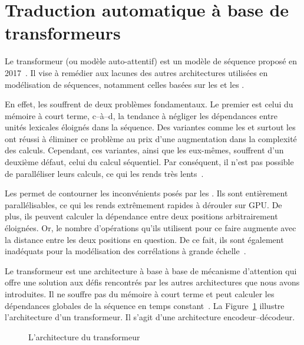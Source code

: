 \section{Traduction automatique à base de transformeurs}
\label{sec:nmt-attention}

Le transformeur (ou modèle auto-attentif) est un modèle de séquence proposé en 2017~\cite{attention}.
Il vise à remédier aux lacunes des autres architectures utilisées en modélisation de séquences, 
notamment celles basées sur les  et les .

En effet, les  souffrent de deux problèmes fondamentaux. 
Le premier est celui du mémoire à court terme, 
c--à--d, la tendance à négliger les dépendances entre unités lexicales éloignés dans la séquence.
Des variantes comme les  et surtout les  
ont réussi à éliminer ce problème au prix d'une augmentation dans la complexité des calculs.
Cependant, ces variantes, ainsi que les  eux-mêmes, souffrent d'un deuxième défaut,
celui du calcul séquentiel.
Par conséquent, il n'est pas possible de paralléliser leurs calculs, 
ce qui les rends très lents~\cite{attention,deep-nmt-survey}.

Les  permet de contourner les inconvénients posés par les .
Ils sont entièrement parallélisables, ce qui les rends extrêmement rapides à dérouler sur GPU.
De plus, ils peuvent calculer la dépendance entre deux positions arbitrairement éloignées.
Or, le nombre d'opérations qu'ils utilisent pour ce faire 
augmente avec la distance entre les deux positions en question.
De ce fait, ils sont également inadéquats pour la modélisation des corrélations à grande échelle~\cite{deep-nmt-survey}.

Le transformeur est une architecture à base à base de mécanisme d'attention 
qui offre une solution aux défis rencontrés par les autres architectures que nous avons introduites.
Il ne souffre pas du mémoire à court terme 
et peut calculer les dépendances globales de la séquence en temps constant~\cite{attention}.
La Figure~\ref{fig:transformer} illustre l'architecture d'un transformeur.
Il s'agit d'une architecture encodeur--décodeur.

\begin{figure}
    \begin{center}
        
    \end{center}
    \caption[L'architecture du transformeur]
    {L'architecture du transformeur~\cite[Fig 1]{attention}}
    \label{fig:transformer}
\end{figure}

